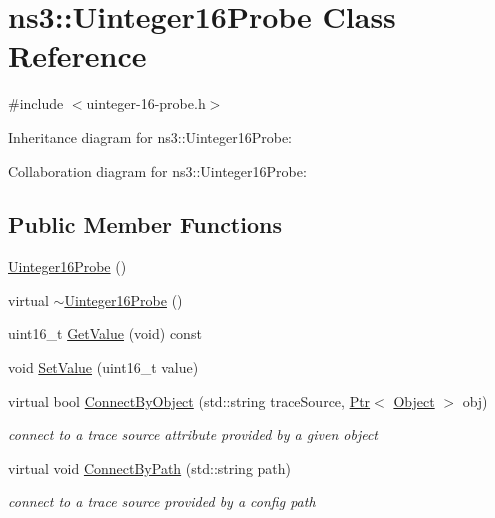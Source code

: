 \hypertarget{classns3_1_1Uinteger16Probe}{}\section{ns3\+:\+:Uinteger16\+Probe Class Reference}
\label{classns3_1_1Uinteger16Probe}


{\ttfamily \#include $<$uinteger-\/16-\/probe.\+h$>$}



Inheritance diagram for ns3\+:\+:Uinteger16\+Probe\+:


Collaboration diagram for ns3\+:\+:Uinteger16\+Probe\+:
\subsection*{Public Member Functions}
\begin{DoxyCompactItemize}
\item 
\hyperlink{classns3_1_1Uinteger16Probe_ac9881910778f3a6272e2a2747b2ac9d8}{Uinteger16\+Probe} ()
\item 
virtual \hyperlink{classns3_1_1Uinteger16Probe_a5ed7e9f10fe8e8222a4a0d352fd3e0bb}{$\sim$\+Uinteger16\+Probe} ()
\item 
uint16\+\_\+t \hyperlink{classns3_1_1Uinteger16Probe_a00b9a8849164e08573c0b0b89968c082}{Get\+Value} (void) const 
\item 
void \hyperlink{classns3_1_1Uinteger16Probe_abe37c8b5349d59475abe57e9b171b6d4}{Set\+Value} (uint16\+\_\+t value)
\item 
virtual bool \hyperlink{classns3_1_1Uinteger16Probe_abcda2c08c530e06129d50a8ea06c145e}{Connect\+By\+Object} (std\+::string trace\+Source, \hyperlink{classns3_1_1Ptr}{Ptr}$<$ \hyperlink{classns3_1_1Object}{Object} $>$ obj)
\begin{DoxyCompactList}\small\item\em connect to a trace source attribute provided by a given object \end{DoxyCompactList}\item 
virtual void \hyperlink{classns3_1_1Uinteger16Probe_aada9bd9beb9145df7e5b8d1e1e97d95b}{Connect\+By\+Path} (std\+::string path)
\begin{DoxyCompactList}\small\item\em connect to a trace source provided by a config path \end{DoxyCompactList}\end{DoxyCompactItemize}
